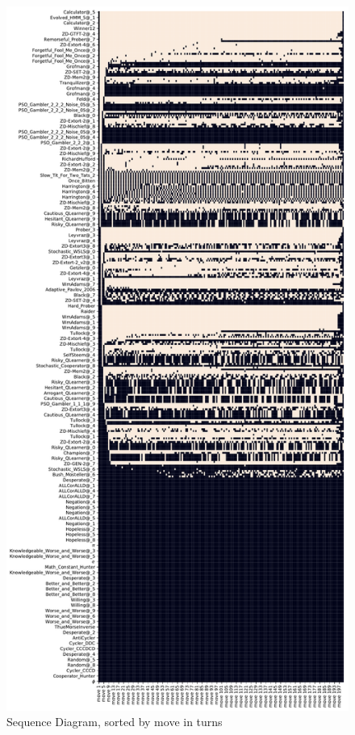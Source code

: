 \begin{figure}[ht]
\begin{minipage}{0.48\textwidth}
    \end{minipage}\hfill
    \begin{minipage}{0.48\textwidth}
        \includegraphics[width=1.0\textwidth, center]{./img/descriptive/sequence_plot_alphabetical_pt2.pdf}
    \end{minipage}
    \caption{Sequence Diagram, sorted by move in turns}\label{fig:sequence_plot_alphabetical}
\end{figure}

